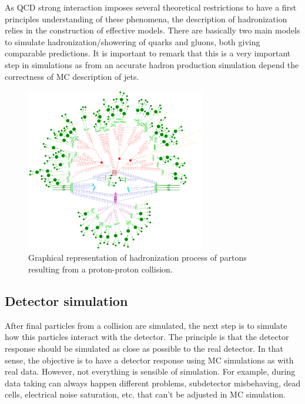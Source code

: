 As QCD strong interaction imposes several theoretical restrictions to have a first principles understanding of these phenomena, the description of hadronization relies in the construction of effective models. There are basically two main models to simulate hadronization/showering of quarks and gluons, both giving comparable predictions. It is important to remark that this is a very important step in simulations as from an accurate hadron production simulation depend the correctness of MC description of jets.

\begin{figure}[!Hhtbp]
  \begin{center}
    \includegraphics[width=0.7\textwidth]{figs/parton_shower.png}
    \caption{Graphical representation of hadronization process of partons resulting from a proton-proton collision.}
    \label{fig:Hadr}
  \end{center}
\end{figure}

\subsection{Detector simulation}
\label{sec:detector}

After final particles from a collision are simulated, the next step is to simulate how this particles interact with the detector. The principle is that the detector response should be simulated as close as possible to the real detector. In that sense, the objective is to have a detector response using MC simulations as with real data. However, not everything is sensible of simulation. For example, during data taking can always happen different problems, subdetector misbehaving, dead cells, electrical noise saturation, etc. that can't be adjusted in MC simulation. 

